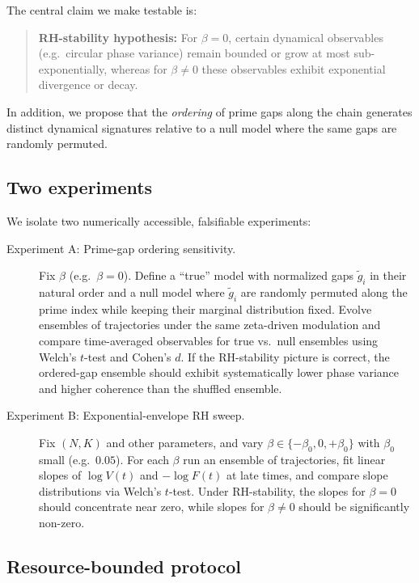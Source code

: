 \documentclass[11pt]{article}
\begin{document}
The central claim we make testable is:
\begin{quote}
  \textbf{RH-stability hypothesis:} For $\beta=0$, certain dynamical observables (e.g.\ circular phase variance) remain bounded or grow at most sub-exponentially, whereas for $\beta\neq 0$ these observables exhibit exponential divergence or decay. 
\end{quote}
In addition, we propose that the \emph{ordering} of prime gaps along the chain generates distinct dynamical signatures relative to a null model where the same gaps are randomly permuted.

\subsection{Two experiments}

We isolate two numerically accessible, falsifiable experiments:
\begin{description}
  \item[Experiment A: Prime-gap ordering sensitivity.] Fix $\beta$ (e.g.\ $\beta=0$). Define a ``true'' model with normalized gaps $\tilde g_i$ in their natural order and a null model where $\tilde g_i$ are randomly permuted along the prime index while keeping their marginal distribution fixed. Evolve ensembles of trajectories under the same zeta-driven modulation and compare time-averaged observables for true vs.\ null ensembles using Welch's $t$-test and Cohen's $d$. If the RH-stability picture is correct, the ordered-gap ensemble should exhibit systematically lower phase variance and higher coherence than the shuffled ensemble.
  \item[Experiment B: Exponential-envelope RH sweep.] Fix $(N,K)$ and other parameters, and vary $\beta\in\{-\beta_0,0,+\beta_0\}$ with $\beta_0$ small (e.g.\ $0.05$). For each $\beta$ run an ensemble of trajectories, fit linear slopes of $\log V(t)$ and $-\log F(t)$ at late times, and compare slope distributions via Welch's $t$-test. Under RH-stability, the slopes for $\beta=0$ should concentrate near zero, while slopes for $\beta\neq 0$ should be significantly non-zero.
\end{description}

\subsection{Resource-bounded protocol}
\end{document}
